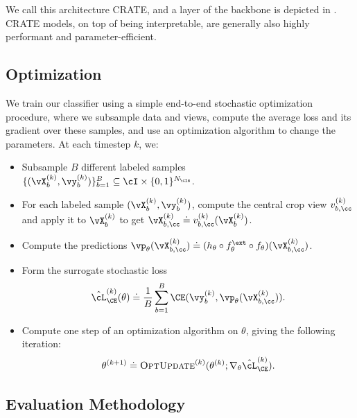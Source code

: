 \documentclass[../../book-main.tex]{subfiles}
\begin{document}
We call this architecture CRATE, and a layer of the backbone is
depicted in . CRATE models, on top of being
interpretable, are generally also highly performant and parameter-efficient.

\subsection{Optimization} \label{sub:image_classification_optimization}

We train our classifier using a simple end-to-end stochastic
optimization procedure, where we subsample data and views, compute
the average loss and its gradient over these samples, and use an
optimization algorithm to change the parameters. At each timestep \(k\), we:
\begin{itemize}
\item Subsample \(B\) different labeled samples \(\{(\vX_{b}^{(k)},
    \vy_{b}^{(k)})\}_{b = 1}^{B} \subseteq \cI \times \{0, 1\}^{N_{\cls}}\).
\item For each labeled sample \((\vX_{b}^{(k)}, \vy_{b}^{(k)})\),
    compute the central crop view \(v_{b, \cc}^{(k)}\) and apply it
    to \(\vX_{b}^{(k)}\) to get \(\vX_{b, \cc}^{(k)} \doteq v_{b,
    \cc}^{(k)}(\vX_{b}^{(k)})\).
\item Compute the predictions \(\vp_{\theta}(\vX_{b, \cc}^{(k)})
        \doteq (h_{\theta} \circ f_{\theta}^{\ext} \circ
    f_{\theta})(\vX_{b, \cc}^{(k)})\).
\item Form the surrogate stochastic loss
    \begin{equation}
        \hat{\cL}_{\CE}^{(k)}(\theta) \doteq \frac{1}{B}\sum_{b =
        1}^{B}\CE(\vy_{b}^{(k)}, \vp_{\theta}(\vX_{b, \cc}^{(k)})).
    \end{equation}
\item Compute one step of an optimization algorithm on \(\theta\),
    giving the following iteration:
    \begin{equation}
        \theta^{(k + 1)} \doteq
        \textsc{OptUpdate}^{(k)}(\theta^{(k)};
        \nabla_{\theta}\hat{\cL}_{\CE}^{(k)}).
    \end{equation}
\end{itemize}

\subsection{Evaluation Methodology} \label{sub:image_classification_evals}
\end{document}
